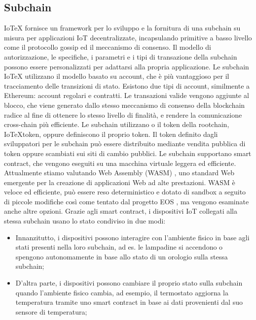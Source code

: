 \subsection{Subchain}
IoTeX fornisce un framework per lo sviluppo e la fornitura di una subchain su misura per applicazioni IoT decentralizzate, incapsulando primitive a basso livello come il protocollo gossip ed il meccanismo di consenso. Il modello di autorizzazione, le specifiche, i parametri e i tipi di transazione della subchain possono essere personalizzati per adattarsi alla propria applicazione.
Le subchain IoTeX utilizzano il modello basato su account, che è più vantaggioso per il tracciamento delle transizioni di stato.
Esistono due tipi di account, similmente a Ethereum: account regolari e contratti. Le transazioni valide vengono aggiunte al blocco, che viene generato dallo stesso meccanismo di consenso della blockchain radice al fine di ottenere lo stesso livello di finalità, e rendere la comunicazione cross-chain più efficiente. Le subchain utilizzano o il token della rootchain, IoTeXtoken, oppure definiscono il proprio token. Il token definito dagli sviluppatori per le subchain può essere distribuito mediante vendita pubblica di token oppure scambiati sui siti di cambio pubblici.
Le subchain supportano smart contract, che vengono eseguiti su una macchina virtuale leggera ed efficiente. Attualmente stiamo valutando Web Assembly (WASM) \cite{c36}, uno standard Web emergente per la creazione di applicazioni Web ad alte prestazioni. WASM è veloce ed efficiente, può essere reso deterministico e dotato di sandbox a seguito di piccole modifiche così come tentato dal progetto EOS \cite{c9}, ma vengono esaminate anche altre opzioni. Grazie agli smart contract, i dispositivi IoT collegati alla stessa subchain usano lo stato condiviso in due modi:

\begin{itemize}
	\item Innanzitutto, i dispositivi possono interagire con l'ambiente fisico in base agli stati presenti nella loro subchain, ad es. le lampadine si accendono o spengono autonomamente in base allo stato di un orologio sulla stessa subchain;

	\item D'altra parte, i dispositivi possono cambiare il proprio stato sulla subchain quando l'ambiente fisico cambia, ad esempio, il termostato aggiorna la temperatura tramite uno smart contract in base ai dati provenienti dal suo sensore di temperatura;
\end{itemize}


